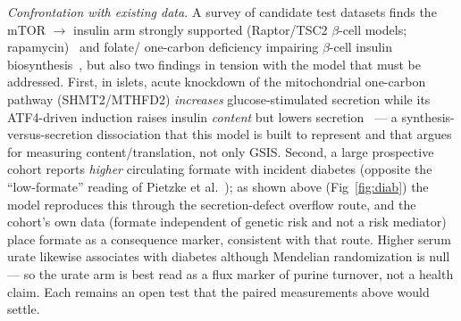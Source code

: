 \documentclass[10pt,letterpaper]{article}
\begin{document}
\emph{Confrontation with existing data.} A survey of candidate test datasets finds the mTOR $\rightarrow$ insulin arm
strongly supported (Raptor/\allowbreak TSC2 $\beta$-cell models; rapamycin)~\cite{ni2017,blandino2017,fraenkel2008} and folate/\allowbreak
one-carbon deficiency impairing $\beta$-cell insulin biosynthesis~\cite{hsu2013},
but also two findings in tension with the model that must be addressed. First, in
islets, acute knockdown of the mitochondrial one-carbon pathway (SHMT2/\allowbreak MTHFD2)
\emph{increases} glucose-stimulated secretion while its ATF4-driven induction
raises insulin \emph{content} but lowers secretion~\cite{pelligra2023} --- a
synthesis-versus-secretion dissociation that this model is built to represent and
that argues for measuring content/translation, not only GSIS. Second, a large
prospective cohort reports \emph{higher} circulating formate with incident
diabetes (opposite the ``low-formate'' reading of Pietzke et al.~\cite{pietzke2019}); as shown above
(Fig~\ref{fig:diab}) the model reproduces this through the secretion-defect
overflow route, and the cohort's own data (formate independent of genetic risk
and not a risk mediator) place formate as a consequence marker, consistent with
that route. Higher serum urate likewise associates with diabetes although
Mendelian randomization is null --- so the urate arm is best read as a flux marker
of purine turnover, not a health claim. Each remains an open test that the paired
measurements above would settle.

\end{document}

